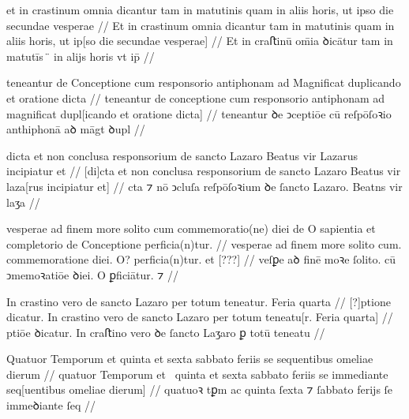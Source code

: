 \ex \bg
\gla
{}
et in crastinum omnia dicantur tam in matutinis
quam in aliis horis, ut ipso die secundae vesperae 
//
\glRekonstrukcja
{}
Et in crastinum omnia dicantur tam in matutinis
quam in aliis horis, ut ip[so die secundae vesperae]
//
\glU
{}
Et in craﬅinū om̄ia ꝺicātur tam in matutīs ̈ in alijs horis vt ip̄   
//
\endgl
\eg


\ex \bg
\gla
{}
teneantur de Conceptione cum responsorio antiphonam ad Magnificat duplicando et oratione
dicta
//
\glRekonstrukcja
{}
teneantur de conceptione cum responsorio antiphonam ad magnificat dupl[icando et oratione
dicta]
//
\glU
{}
teneantur ꝺe ↄceptiōe cū reſpōſoꝛio anthiphonā aꝺ māgt ꝺupl   
//
\endgl
\eg




\ex \bg
\gla
{}
dicta et non conclusa responsorium de sancto Lazaro Beatus vir Lazarus
incipiatur et 
//
\glRekonstrukcja
{}
[di]cta et non conclusa responsorium de sancto Lazaro Beatus vir laza[rus
incipiatur et] 
//
\glU
{}
cta ⁊ nō ↄcluſa reſpōſoꝛium ꝺe ſancto Lazaro. Beatns vir laʒa  
//
\endgl
\eg



\ex \bg
\gla
{}
vesperae ad finem more solito cum commemoratio(ne) diei
de O sapientia et completorio de Conceptione perficia(n)tur.
//
\glRekonstrukcja
{}
vesperae ad finem more solito cum. commemoratione diei.
{} O? {} {} {} {} perficia(n)tur. et
[???]
//
\glU
{}
veſꝑe aꝺ finē moꝛe ſolito. cū ↄmemoꝛatiōe ꝺiei. {} O {} {} {} {} ꝑficiātur. ⁊ 
//
\endgl
\eg



\ex \bg
\gla
{} %
{} {} In crastino vero de sancto Lazaro per totum teneatur.
Feria quarta 
//
\glRekonstrukcja
{} %
[?]ptione dicatur.
In crastino vero de sancto Lazaro per totum teneatu[r.
Feria quarta] 
//
\glU
{}
ptiōe ꝺicatur. In craﬅino vero ꝺe ſancto Laʒaro ꝑ totū teneatu  
//
\endgl
\eg



\ex \bg
\gla
{}
Quatuor Temporum et quinta et sexta sabbato feriis se
{} sequentibus omeliae dierum
//
\glRekonstrukcja
{}
quatuor Temporum et~ quinta et sexta sabbato feriis se
immediante seq[uentibus omeliae dierum]
//
\glU
{}
quatuoꝛ tꝑm ac quinta {} ſexta ⁊ ſabbato ferijs ſe immeꝺiante ſeq  
//
\endgl
\eg



